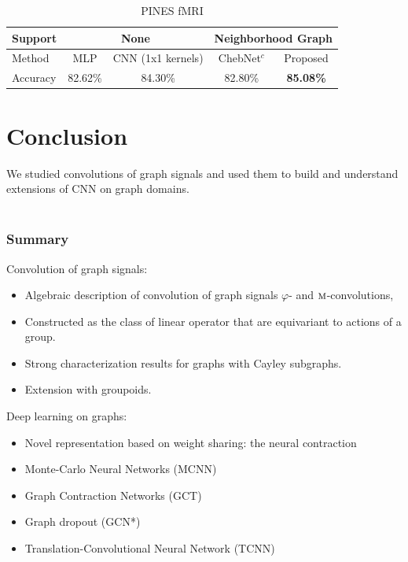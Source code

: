 \documentclass[t,9pt,pdftex]{beamer}
\theoremstyle{definition}
\DeclareMathOperator{\M}{\textsc{m}}
\newcommand{\h}[1]{\hspace{#1pt}}
\begin{document}
\begin{frame}
\pause

  \begin{table}[h!]
\centering
\label{tab:iaps-table}
\begin{tabular}{|l||c|c||c|c|}
\hline
\multicolumn{1}{|l||}{Support} & \multicolumn{2}{c||}{None} & \multicolumn{2}{c|}{Neighborhood Graph}     \\ \hline
Method                      & MLP & CNN (1x1 kernels)                                & ChebNet$^c$ & Proposed                   \\ \hline
Accuracy                    & 82.62\% & 84.30\%                            & 82.80\%                            & \textbf{85.08\%} \\ \hline
\end{tabular}
\caption{PINES fMRI}
\end{table}
\end{frame}

\section{Conclusion}

\begin{frame}[c, label=current]
  We studied convolutions of graph signals and used them to build and understand extensions of CNN on graph domains.\\
  \h{0}\\
  \frametitle{Summary}
  Convolution of graph signals:
  \begin{itemize}
    \item Algebraic description of convolution of graph signals $\varphi$- and $\M$-convolutions,
    \item Constructed as the class of linear operator that are equivariant to actions of a group.
    \item Strong characterization results for graphs with Cayley subgraphs.
    \item Extension with groupoids.
  \end{itemize}
  Deep learning on graphs:
  \begin{itemize}
    \item Novel representation based on weight sharing: the neural contraction
    \item Monte-Carlo Neural Networks (MCNN)
    \item Graph Contraction Networks (GCT)
    \item Graph dropout (GCN*)
    \item Translation-Convolutional Neural Network (TCNN)
  \end{itemize}
\end{frame}
\end{document}
